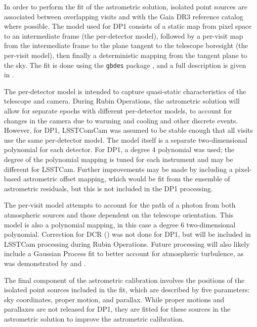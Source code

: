 In order to perform the fit of the astrometric solution, isolated point sources are associated between overlapping visits and with the Gaia \gls{DR3} \citep{2023A&A...674A...1G} reference catalog where possible.
The model used for \gls{DP1} consists of a static map from pixel space to an intermediate frame (the per-detector model), followed by a per-visit map from the intermediate frame to the plane tangent to the telescope boresight (the per-visit model), then finally a deterministic mapping from the tangent plane to the sky.
The fit is done using the \texttt{gbdes} package \citep{2017PASP..129g4503B}, and a full description is given in \citet{DMTN-266}.

The per-detector model is intended to capture quasi-static characteristics of the telescope and camera.
During \gls{Rubin Operations}, the astrometric solution will allow for separate epochs with different per-detector models, to account for changes in the camera due to warming and cooling and other discrete events.
However, for \gls{DP1}, \gls{LSSTComCam} was assumed to be stable enough that all visits use the same per-detector model. The model itself is a separate two-dimensional polynomial for each detector.
For \gls{DP1}, a degree 4 polynomial was used; the degree of the polynomial mapping is tuned for each instrument and may be different for LSSTCam.
Further improvements may be made by including a pixel-based astrometric offset mapping, which would be fit from the ensemble of astrometric residuals, but this is not included in the \gls{DP1} processing.

The per-visit model attempts to account for the path of a photon from both atmospheric sources and those dependent on the telescope orientation.
This model is also a polynomial mapping, in this case a degree 6 two-dimensional polynomial.
Correction for \gls{DCR} () was not done for \gls{DP1}, but will be included in \gls{LSSTCam} processing during \gls{Rubin Operations}.
Future processing will also likely include a Gaussian Process fit to better account for atmospheric turbulence, as was demonstrated by \citet{2021AJ....162..106F} and \citet{2021A&A...650A..81L}.

The final component of the astrometric \gls{calibration} involves the positions of the isolated point sources included in the fit, which are described by five parameters: sky coordinates, proper motion, and parallax.
While proper motions and parallaxes are not released for \gls{DP1}, they are fitted for these sources in the astrometric solution to improve the astrometric calibration.

